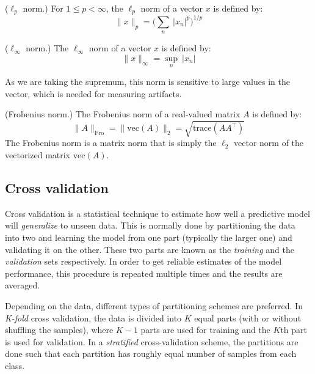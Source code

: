 \begin{definition}{($\ell_p$ norm.)}
For $1 \leq p < \infty$, the $\ell_p$ norm of a vector $x$ is defined by:
\begin{equation}
\|x\|_p = \Big(\sum_n \ \lvert x_n \rvert^p \Big)^{1/p}
\end{equation}
\end{definition}
%
\begin{definition}{($\ell_\infty$ norm.)}
The $\ell_\infty$ norm of a vector $x$ is defined by:
\begin{equation}
\|x\|_{\infty} = \sup_n \ \lvert x_n \rvert
\end{equation}
\end{definition}
As we are taking the supremum, this norm is sensitive to large values in the vector, which is needed for measuring artifacts.
%
\begin{definition}{(Frobenius norm.)}
The Frobenius norm of a real-valued matrix $A$ is defined by:
\begin{equation}
\|A\|_{\mathrm{Fro}} = \| \mathrm{vec}(A) \|_2 = \sqrt{\mathrm{trace}(AA^\top)}
\end{equation}
%
The Frobenius norm is a matrix norm that is simply the $\ell_2$ vector norm of the vectorized matrix $\mathrm{vec}(A)$.

\end{definition}

\subsection{Cross validation}

Cross validation is a statistical technique to estimate how well a predictive model will \emph{generalize} to unseen data. This is normally done by partitioning the data into two and learning the model from one part (typically the larger one) and validating it on the other. These two parts are known as the \emph{training} and the \emph{validation} sets respectively. In order to get reliable estimates of the model performance, this procedure is repeated multiple times and the results are averaged.

Depending on the data, different types of partitioning schemes are preferred. In \emph{K-fold} cross validation, the data is divided into $K$ equal parts (with or without shuffling the samples), where $K - 1$ parts are used for training and the $K$th part is used for validation. In a \emph{stratified} cross-validation scheme, the partitions are done such that each partition has roughly equal number of samples from each class.

